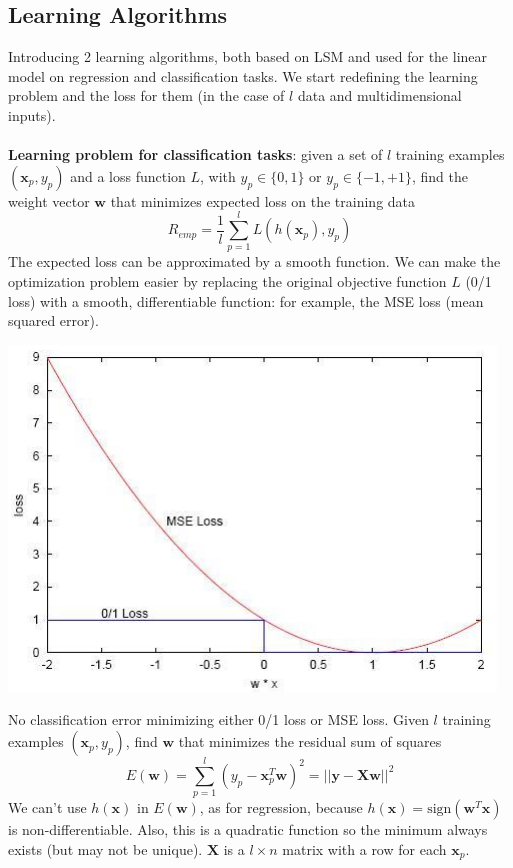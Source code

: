 \documentclass[10pt]{report}
\begin{document}
\subsection{Learning Algorithms} Introducing 2 learning algorithms, both based on LSM and used for the linear model on regression and classification tasks. We start redefining the learning problem and the loss for them (in the case of $l$ data and multidimensional inputs).\\\\
\textbf{Learning problem for classification tasks}: given a set of $l$ training examples $(\mathbf{x}_p, y_p)$ and a loss function $L$, with $y_p \in \{0,1\}$ or $y_p \in \{-1, +1\}$, find the weight vector $\mathbf{w}$ that minimizes expected loss on the training data $$R_{emp} = \frac{1}{l}\sum_{p=1}^l L(h(\mathbf{x}_p), y_p)$$
The expected loss can be approximated by a smooth function. We can make the optimization problem easier by replacing the original objective function $L$ (0/1 loss) with a smooth, differentiable function: for example, the MSE loss (mean squared error).
\begin{center}
	\includegraphics[scale=0.75]{4.png}
\end{center}
No classification error minimizing either 0/1 loss or MSE loss. Given $l$ training examples $(\mathbf{x}_p, y_p)$, find $\mathbf{w}$ that minimizes the residual sum of squares $$E(\mathbf{w})= \sum_{p=1}^l (y_p - \mathbf{x}_p^T \mathbf{w})^2 = ||\mathbf{y} - \mathbf{Xw}||^2$$
We can't use $h(\mathbf{x})$ in $E(\mathbf{w})$, as for regression, because $h(\mathbf{x}) = \text{sign}(\mathbf{w}^T \mathbf{x})$ is non-differentiable. Also, this is a quadratic function so the minimum always exists (but may not be unique). $\mathbf{X}$ is a $l\times n$ matrix with a row for each $\mathbf{x}_p$.
\end{document}
